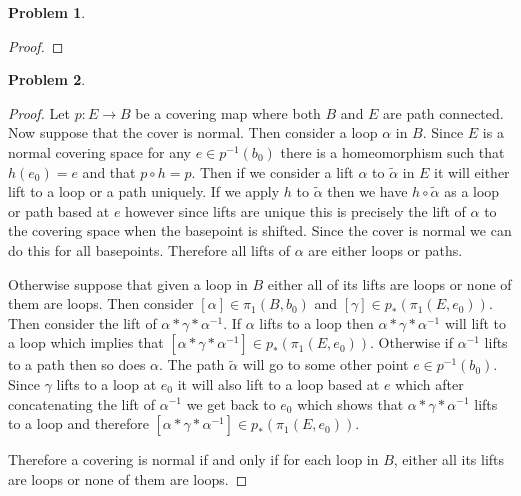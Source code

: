 \documentclass[10pt]{article}
\newcommand{\sk}{\vskip 10mm}
\theoremstyle{plain}
\newtheorem{problem}{Problem}
\theoremstyle{remark}
\begin{document}
\begin{problem} %
  
\end{problem}

\begin{proof}
  
\end{proof}

\sk

\begin{problem} %
  
\end{problem}

\begin{proof}
  Let $p:E\rightarrow B$ be a covering map where both $B$ and $E$ are path connected.
  Now suppose that the cover is normal. Then consider a loop $\alpha$ in $B$.
  Since $E$ is a normal covering space for any $e\in p^{-1}(b_0)$ there
  is a homeomorphism such that $h(e_0)=e$ and that $p\circ h=p$. Then
  if we consider a lift $\alpha$ to $\widetilde{\alpha}$ in $E$ it will either
  lift to a loop or a path uniquely. If we apply $h$ to $\widetilde{\alpha}$
  then we have $h\circ\widetilde{\alpha}$ as a loop or path based at $e$ however
  since lifts are unique this is precisely the lift of $\alpha$ to the
  covering space when the basepoint is shifted. Since the cover is
  normal we can do this for all basepoints. Therefore all lifts
  of $\alpha$ are either loops or paths.

  Otherwise suppose that given a loop in $B$ either all of its lifts
  are loops or none of them are loops. Then consider $[\alpha]\in\pi_1(B,b_0)$ and
  $[\gamma]\in p_*(\pi_1(E,e_0))$. Then consider the lift of $\alpha*\gamma*\alpha^{-1}$. If
  $\alpha$ lifts to a loop then $\alpha*\gamma*\alpha^{-1}$ will lift to a loop which
  implies that $[\alpha*\gamma*\alpha^{-1}]\in p_*(\pi_1(E,e_0))$. Otherwise
  if $\alpha^{-1}$ lifts to a path then so does $\alpha$. The path
  $\widetilde{\alpha}$ will go to some other point $e\in p^{-1}(b_0)$. Since
  $\gamma$ lifts to a loop at $e_0$ it will also lift to a loop based at $e$ which
  after concatenating the lift of $\alpha^{-1}$ we get back to $e_0$ which shows
  that $\alpha*\gamma*\alpha^{-1}$ lifts to a loop and therefore $[\alpha*\gamma*\alpha^{-1}]\in p_*(\pi_1(E,e_0))$.

  Therefore a covering is normal if and only if for each loop in $B$,
  either all its lifts are loops or none of them are loops.
\end{proof}
\end{document}
